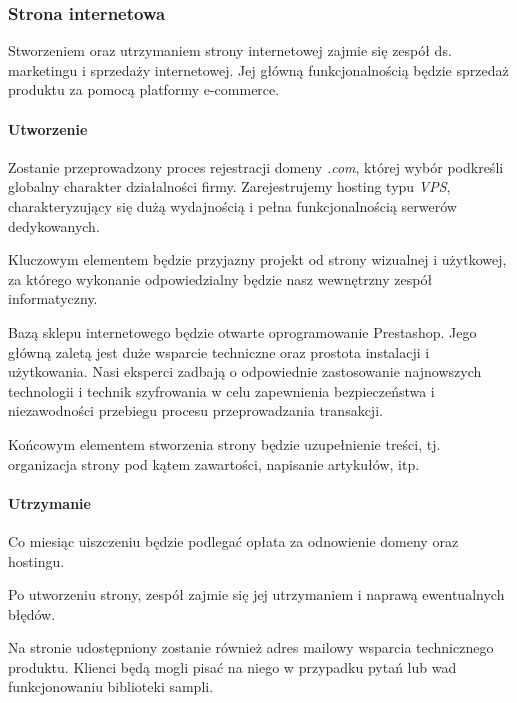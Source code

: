 \documentclass[12pt]{article}
\begin{document}
\subsubsection{Strona internetowa}

Stworzeniem oraz utrzymaniem strony internetowej zajmie się zespół ds. marketingu i sprzedaży internetowej.
Jej główną funkcjonalnością będzie sprzedaż produktu za pomocą platformy e-commerce.

\paragraph{Utworzenie}

Zostanie przeprowadzony proces rejestracji domeny \textit{.com}, której wybór podkreśli globalny charakter działalności firmy.
Zarejestrujemy hosting typu \textit{VPS}, charakteryzujący się dużą wydajnością i pełna funkcjonalnością serwerów dedykowanych.

Kluczowym elementem będzie przyjazny projekt od strony wizualnej i użytkowej, za którego wykonanie odpowiedzialny będzie nasz wewnętrzny zespół informatyczny.

Bazą sklepu internetowego będzie otwarte oprogramowanie Prestashop.
Jego główną zaletą jest duże wsparcie techniczne oraz prostota instalacji i użytkowania.
Nasi eksperci zadbają o odpowiednie zastosowanie najnowszych technologii i technik szyfrowania w celu zapewnienia bezpieczeństwa i niezawodności przebiegu procesu przeprowadzania transakcji.

Końcowym elementem stworzenia strony będzie uzupełnienie treści, tj. organizacja strony pod kątem zawartości, napisanie artykułów, itp.

\paragraph{Utrzymanie}

Co miesiąc uiszczeniu będzie podlegać opłata za odnowienie domeny oraz hostingu.

Po utworzeniu strony, zespół zajmie się jej utrzymaniem i naprawą ewentualnych błędów.

Na stronie udostępniony zostanie również adres mailowy wsparcia technicznego produktu.
Klienci będą mogli pisać na niego w przypadku pytań lub wad funkcjonowaniu biblioteki sampli.
\end{document}
